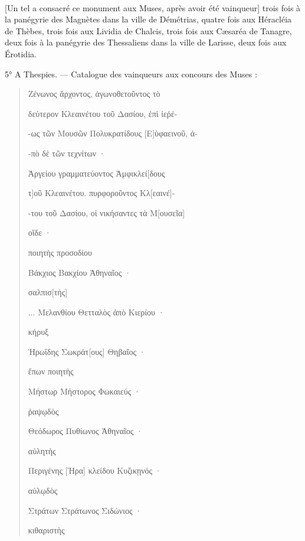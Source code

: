 \documentclass[a4paper, 11pt, oneside, polutonikogreek, french]{article}
\begin{document}
\paragraph{}
[Un tel a consacré ce monument aux Muses, après avoir été vainqueur] trois fois à la panégyrie des Magnètes dans la ville de Démétrias, quatre fois aux Héracléia de Thèbes, trois fois aux Lividia de Chalcis, trois fois aux Cæsaréa de Tanagre, deux fois à la panégyrie des Thessaliens dans la ville de Larisse, deux fois aux Érotidia.

5° A Thespies. --- Catalogue des vainqueurs aux concours des Muses :
\begin{quotation}
Ζένωνος ἄρχοντος, ἀγωνοθετοῦντος τὸ

δεύτερον Κλεαινέτου τοῦ Δασίου, ἐπὶ ἱεῤέ-

-ως τῶν Μουσῶν Πολυκρατίδους [Ε]ὐφαεινοῦ, ἀ-

-πὸ δὲ τῶν τεχνίτων ·

Ἀργείου γραμματεύοντος Ἀμφικλεί[δους

τ]οῦ Κλεαινέτου. πυρφοροῦντος Κλ[εαινέ]-

-του τοῦ Δασίου, οἱ νικήσαντες τὰ Μ[ουσεῖα]

οἵδε ·

\hspace*{5mm}ποιητὴς προσοδίου

Βάκχιος Βακχίου Ἀθηναῖος ·

\hspace*{5mm}σαλπισ[τὴς]

... Μελανθίου Θετταλὸς ἀπὸ Κιερίου ·

\hspace*{5mm}κήρυξ

Ἡρωΐδης Σωκράτ[ους] Θηβαῖος ·

\hspace*{5mm}ἔπων ποιητὴς

Μήστωρ Μήστορος Φωκαιεύς ·

\hspace*{5mm}ῥαψῳδὸς

Θεόδωρος Πυθίωνος Ἀθηναῖος ·

\hspace*{5mm}αὐλητὴς

Περιγένης [Ἡρα] κλείδου Κυζικῃνός ·

\hspace*{5mm}αὐλῳδὸς

Στράτων Στράτωνος Σιδώνιος ·

\hspace*{5mm}κιθαριστὴς


\end{quotation}
\end{document}
